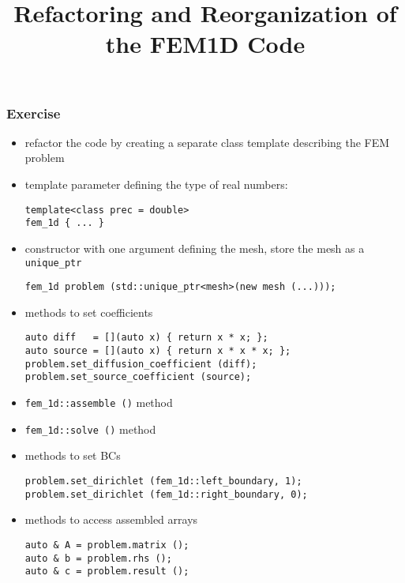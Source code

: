\documentclass[smaller,a4paper]{beamer}
\newcommand{\cpp}[1]{\lstinline!#1!}
\begin{document}
\title{Refactoring and Reorganization of the FEM1D Code}
\frame{\titlepage}


\begin{frame}[fragile]\frametitle{Exercise}
\begin{itemize}\small
\item refactor the code by creating a separate class template describing the FEM problem
\item template parameter defining the type of real numbers:
\begin{lstlisting}
template<class prec = double>
fem_1d { ... }
\end{lstlisting}
\item constructor with one argument defining the mesh, store the mesh as a \cpp{unique_ptr}
\begin{lstlisting}
fem_1d problem (std::unique_ptr<mesh>(new mesh (...)));
\end{lstlisting}
\item methods to set coefficients
\begin{lstlisting}
auto diff   = [](auto x) { return x * x; };
auto source = [](auto x) { return x * x * x; };
problem.set_diffusion_coefficient (diff);
problem.set_source_coefficient (source);
\end{lstlisting}
\item \cpp{fem_1d::assemble ()} method
\item \cpp{fem_1d::solve ()} method
\item methods to set BCs
\begin{lstlisting}
problem.set_dirichlet (fem_1d::left_boundary, 1);
problem.set_dirichlet (fem_1d::right_boundary, 0);
\end{lstlisting}
\item methods to access assembled arrays
\begin{lstlisting}
auto & A = problem.matrix ();
auto & b = problem.rhs ();
auto & c = problem.result ();
\end{lstlisting}
\end{itemize}
\end{frame}
\end{document}

